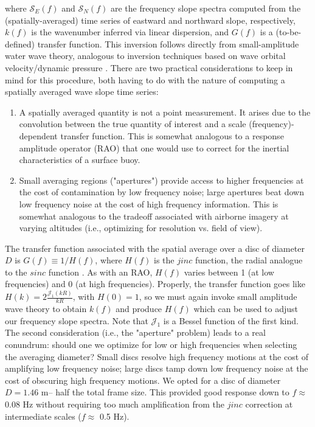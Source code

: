 \documentclass[letterpaper,draftcls,onecolumn]{IEEEtran}
\begin{document}
\noindent where $\mathcal{S}_E(f)$ and $\mathcal{S}_N(f)$ are the frequency slope spectra computed from the (spatially-averaged) time series of eastward and northward slope, respectively, $k(f)$ is the wavenumber inferred via linear dispersion, and $G(f)$ is a (to-be-defined) transfer function. This inversion follows directly from small-amplitude water wave theory, analogous to inversion techniques based on wave orbital velocity/dynamic pressure \cite{guza_local_1980}. There are two practical considerations to keep in mind for this procedure, both having to do with the nature of computing a spatially averaged wave slope time series:
\begin{enumerate}
	\item A spatially averaged quantity is not a point measurement. It arises due to the convolution between the true quantity of interest and a scale (frequency)-dependent transfer function. This is somewhat analogous to a response amplitude operator (RAO) that one would use to correct for the inertial characteristics of a surface buoy.
	\item Small averaging regions ("apertures") provide access to higher frequencies at the cost of contamination by low frequency noise; large apertures beat down low frequency noise at the cost of high frequency information. This is somewhat analogous to the tradeoff associated with airborne imagery at varying altitudes (i.e., optimizing for resolution vs. field of view).
\end{enumerate}

The transfer function associated with the spatial average over a disc of diameter $D$ is $G(f)\equiv 1/H(f)$, where $H(f)$ is the $jinc$ function, the radial analogue to the $sinc$ function \cite{bracewell_fourier_2000}. As with an RAO, $H(f)$ varies between 1 (at low frequencies) and 0 (at high frequencies). Properly, the transfer function goes like $H(k) = 2 \frac{\mathcal{J}_1(kR)}{kR}$, with $H(0) = 1$, so we must again invoke small amplitude wave theory to obtain $k(f)$ and produce $H(f)$ which can be used to adjust our frequency slope spectra. Note that $\mathcal{J}_1$ is a Bessel function of the first kind. The second consideration (i.e., the "aperture" problem) leads to a real conundrum: should one we optimize for low or high frequencies when selecting the averaging diameter? Small discs resolve high frequency motions at the cost of amplifying low frequency noise; large discs tamp down low frequency noise at the cost of obscuring high frequency motions. We opted for a disc of diameter $D=1.46$ m-- half the total frame size. This provided good response down to $f\approx$ 0.08 Hz without requiring too much amplification from the $jinc$ correction at intermediate scales ($f\approx$ 0.5 Hz).
\end{document}
